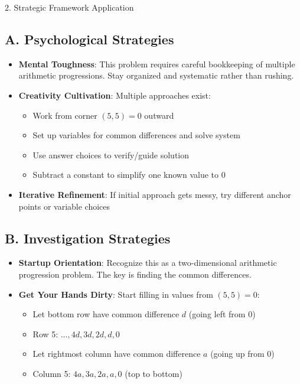 \documentclass[12pt]{article}
\begin{document}
\begin{strategybox}{2. Strategic Framework Application}

\subsection*{A. Psychological Strategies}
\begin{itemize}[leftmargin=*]
    \item \textbf{Mental Toughness}: This problem requires careful bookkeeping of multiple arithmetic progressions. Stay organized and systematic rather than rushing.
    
    \item \textbf{Creativity Cultivation}: Multiple approaches exist:
    \begin{itemize}
        \item Work from corner $(5,5) = 0$ outward
        \item Set up variables for common differences and solve system
        \item Use answer choices to verify/guide solution
        \item Subtract a constant to simplify one known value to 0
    \end{itemize}
    
    \item \textbf{Iterative Refinement}: If initial approach gets messy, try different anchor points or variable choices
\end{itemize}

\subsection*{B. Investigation Strategies}
\begin{itemize}[leftmargin=*]
    \item \textbf{Startup Orientation}: Recognize this as a two-dimensional arithmetic progression problem. The key is finding the common differences.
    
    \item \textbf{Get Your Hands Dirty}: Start filling in values from $(5,5) = 0$:
    \begin{itemize}
        \item Let bottom row have common difference $d$ (going left from 0)
        \item Row 5: $\ldots, 4d, 3d, 2d, d, 0$
        \item Let rightmost column have common difference $a$ (going up from 0)
        \item Column 5: $4a, 3a, 2a, a, 0$ (top to bottom)
    \end{itemize}
    

\end{itemize}
\end{strategybox}
\end{document}
